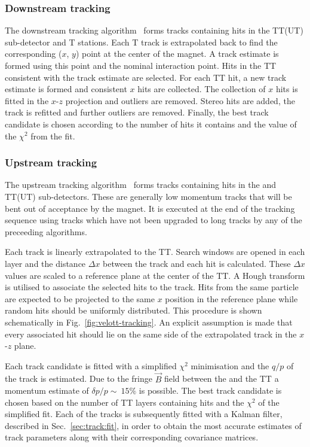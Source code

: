 \subsubsection{Downstream tracking}
\label{sec:track:algos:downstream}

The downstream tracking algorithm~\cite{patdownstream,sascha} forms tracks containing hits in the TT(UT) sub-detector and T stations. Each T track is extrapolated back to find the corresponding ($x$, $y$) point at the center of the magnet. A track estimate is formed using this point and the nominal interaction point. Hits in the TT consistent with the track estimate are selected. For each TT hit, a new track estimate is formed and consistent $x$ hits are collected. The collection of $x$ hits is fitted in the $x$-$z$ projection and outliers are removed. Stereo hits are added, the track is refitted and further outliers are removed. Finally, the best track candidate is chosen according to the number of hits it contains and the value of the $\chi^{2}$ from the fit.


\subsubsection{Upstream tracking}
\label{sec:track:algos:upstream}

The upstream tracking algorithm~\cite{patvelott} forms tracks containing hits in the \velo and TT(UT) sub-detectors. These are generally low momentum tracks that will be bent out of acceptance by the magnet. It is executed at the end of the tracking sequence using \velo tracks which have not been upgraded to long tracks by any of the preceeding algorithms. 

Each \velo track is linearly extrapolated to the TT. Search windows are opened in each layer and the distance $\Delta x$ between the track and each hit is calculated. These $\Delta x$ values are scaled to a reference plane at the center of the TT. A Hough transform is utilised to associate the selected hits to the \velo track. Hits from the same particle are expected to be projected to the same $x$ position in the reference plane while random hits should be uniformly distributed. This procedure is shown schematically in Fig.~\ref{fig:velott-tracking}. An explicit assumption is made that every associated hit should lie on the same side of the extrapolated \velo track in the $x$-$z$ plane. 

 Each track candidate is fitted with a simplified $\chi^{2}$ minimisation and the $q/p$ of the track is estimated. Due to the fringe $\vec{B}$ field between the \velo and the TT a momentum estimate of $\delta p/p \sim~15\%$ is possible. The best track candidate is chosen based on the number of TT layers containing hits and the $\chi^{2}$ of the simplified fit. Each of the \velott tracks is subsequently fitted with a Kalman filter, described in Sec.~\ref{sec:track:fit}, in order to obtain the most accurate estimates of track parameters along with their corresponding covariance matrices.

